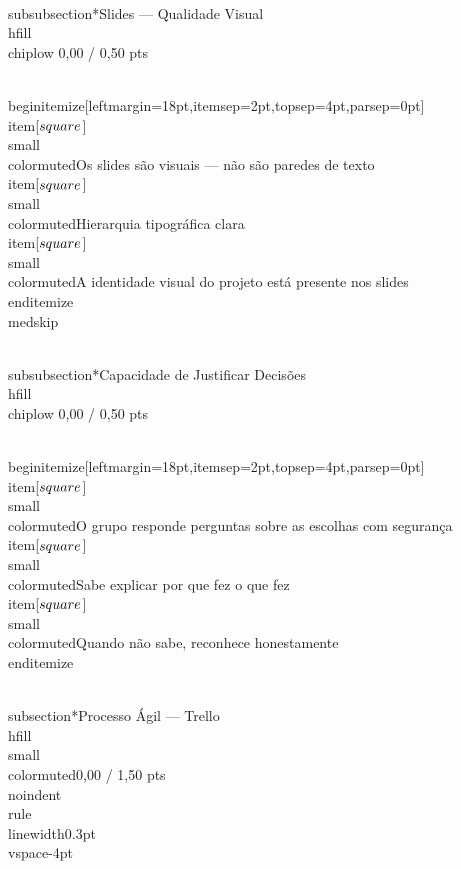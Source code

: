\documentclass[11pt, a4paper]{article}
\newcommand{\chiplow}[1]{\colorbox{crimsondim}{\color{crimson}\semibold\small\strut\ #1\ }}
\begin{document}
\\subsubsection*{Slides — Qualidade Visual \\hfill {\\chiplow 0,00 / 0,50 pts}}

\\begin{itemize}[leftmargin=18pt,itemsep=2pt,topsep=4pt,parsep=0pt]
  \\item[$\\square$] {\\small\\color{muted}Os slides são visuais — não são paredes de texto}
  \\item[$\\square$] {\\small\\color{muted}Hierarquia tipográfica clara}
  \\item[$\\square$] {\\small\\color{muted}A identidade visual do projeto está presente nos slides}
\\end{itemize}
\\medskip

\\subsubsection*{Capacidade de Justificar Decisões \\hfill {\\chiplow 0,00 / 0,50 pts}}

\\begin{itemize}[leftmargin=18pt,itemsep=2pt,topsep=4pt,parsep=0pt]
  \\item[$\\square$] {\\small\\color{muted}O grupo responde perguntas sobre as escolhas com segurança}
  \\item[$\\square$] {\\small\\color{muted}Sabe explicar por que fez o que fez}
  \\item[$\\square$] {\\small\\color{muted}Quando não sabe, reconhece honestamente}
\\end{itemize}

\\subsection*{Processo Ágil — Trello \\hfill {\\small\\color{muted}0,00 / 1,50 pts}}
\\noindent\\rule{\\linewidth}{0.3pt}\\vspace{-4pt}
\end{document}
